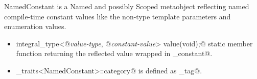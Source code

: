 {\metaobject NamedConstant} is a {\metaobject Named} and possibly {\metaobject Scoped} metaobject reflecting
named compile-time constant values like the non-type template parameters and enumeration values.

\begin{itemize}
	\item{\verb@static integral_type<@{\em value-type}\verb@, @{\em constant-value}\verb@> value(void);@}
	static member function returning the reflected value wrapped in \verb@integral_constant@.

	\item \verb@metaobject_traits<NamedConstant>::category@ is defined as \verb@constant_tag@.
\end{itemize}

